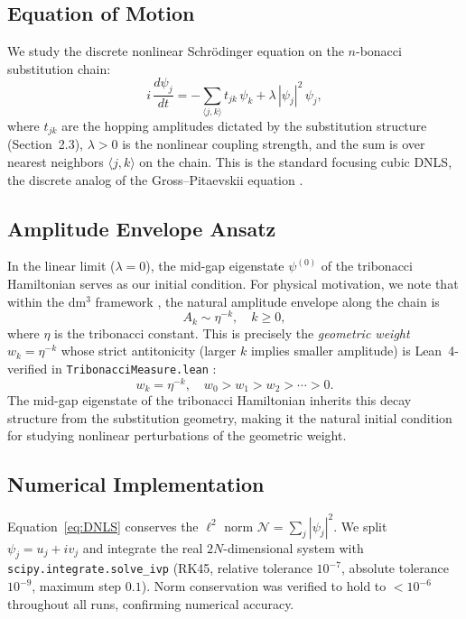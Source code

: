 \documentclass[12pt,a4paper]{article}
\begin{document}
\subsection{Equation of Motion}

We study the discrete nonlinear Schr\"{o}dinger equation on the
$n$-bonacci substitution chain:
\begin{equation}
  i\,\frac{d\psi_j}{dt} = -\sum_{\langle j,k\rangle} t_{jk}\,\psi_k
    + \lambda\,|\psi_j|^2\,\psi_j,
  \label{eq:DNLS}
\end{equation}
where $t_{jk}$ are the hopping amplitudes dictated by the substitution
structure (Section~2.3), $\lambda > 0$ is the nonlinear coupling strength,
and the sum is over nearest neighbors $\langle j,k \rangle$ on the chain.
This is the standard focusing cubic DNLS, the discrete analog of the
Gross--Pitaevskii equation \cite{Eilbeck1985,Kevrekidis2009}.

\subsection{Amplitude Envelope Ansatz}

In the linear limit ($\lambda = 0$), the mid-gap eigenstate $\psi^{(0)}$
of the tribonacci Hamiltonian serves as our initial condition. For physical
motivation, we note that within the dm$^3$ framework \cite{Grossi2026_Vol1},
the natural amplitude envelope along the chain is
\[
  A_k \sim \eta^{-k}, \quad k \geq 0,
\]
where $\eta$ is the tribonacci constant. This is precisely the \emph{geometric
weight} $w_k = \eta^{-k}$ whose strict antitonicity (larger $k$ implies
smaller amplitude) is Lean~4-verified in \texttt{TribonacciMeasure.lean}
\cite{AXLE2026}:
\begin{equation}
  w_k = \eta^{-k}, \quad w_0 > w_1 > w_2 > \cdots > 0.
  \label{eq:weight}
\end{equation}
The mid-gap eigenstate of the tribonacci Hamiltonian inherits this decay
structure from the substitution geometry, making it the natural initial
condition for studying nonlinear perturbations of the geometric weight.

\subsection{Numerical Implementation}

Equation~\eqref{eq:DNLS} conserves the $\ell^2$ norm
$\mathcal{N} = \sum_j |\psi_j|^2$. We split $\psi_j = u_j + iv_j$ and
integrate the real $2N$-dimensional system with \texttt{scipy.integrate.solve\_ivp}
(RK45, relative tolerance $10^{-7}$, absolute tolerance $10^{-9}$, maximum
step $0.1$). Norm conservation was verified to hold to $< 10^{-6}$ throughout
all runs, confirming numerical accuracy.
\end{document}
